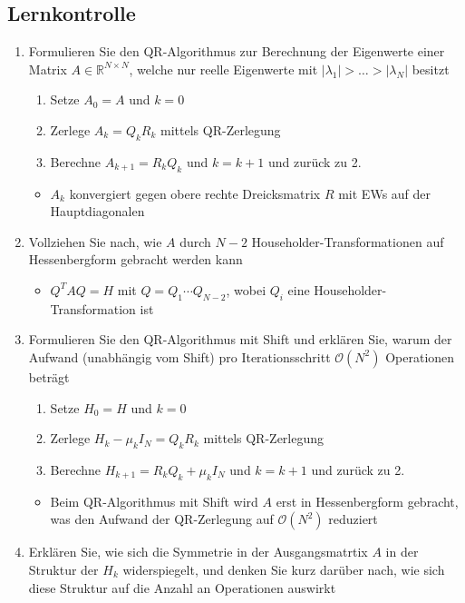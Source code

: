 \documentclass[]{article}
\newcommand*{\real}{\ensuremath{\mathbb{R}}}
\newcommand*{\landau}{\ensuremath{\mathcal{O}}}
\begin{document}
\subsection{Lernkontrolle}
	\begin{enumerate}
		\item Formulieren Sie den QR-Algorithmus zur Berechnung der Eigenwerte einer Matrix $A \in \real^{N \times N}$, welche nur reelle Eigenwerte mit $|\lambda_1| > \dots > |\lambda_N|$ besitzt
			\begin{enumerate}
				\item Setze $A_0 = A$ und $k = 0$
				\item Zerlege $A_k = Q_kR_k$ mittels QR-Zerlegung
				\item Berechne $A_{k+1} = R_kQ_k$ und $k = k+1$ und zurück zu 2.
			\end{enumerate}
			\begin{itemize}
				\item $A_k$ konvergiert gegen obere rechte Dreicksmatrix $R$ mit EWs auf der Hauptdiagonalen
			\end{itemize}
		\item Vollziehen Sie nach, wie $A$ durch $N-2$ Householder-Transformationen auf Hessenbergform gebracht werden kann
			\begin{itemize}
				\item $Q^TAQ = H$ mit $Q = Q_1 \cdots Q_{N-2}$, wobei $Q_i$ eine Householder-Transformation ist
			\end{itemize}
		\item Formulieren Sie den QR-Algorithmus mit Shift und erklären Sie, warum der Aufwand (unabhängig vom Shift) pro Iterationsschritt $\landau(N^2)$ Operationen beträgt
			\begin{enumerate}
				\item Setze $H_0 = H$ und $k = 0$
				\item Zerlege $H_k - \mu_kI_N = Q_kR_k$ mittels QR-Zerlegung
				\item Berechne $H_{k+1} = R_kQ_k + \mu_kI_N$ und $k = k+1$ und zurück zu 2.
			\end{enumerate}
			\begin{itemize}
				\item Beim QR-Algorithmus mit Shift wird $A$ erst in Hessenbergform gebracht, was den Aufwand der QR-Zerlegung auf $\landau(N^2)$ reduziert
			\end{itemize}
		\item Erklären Sie, wie sich die Symmetrie in der Ausgangsmatrtix $A$ in der Struktur der $H_k$ widerspiegelt, und denken Sie kurz darüber nach, wie sich diese Struktur auf die Anzahl an Operationen auswirkt

\end{enumerate}
\end{document}
